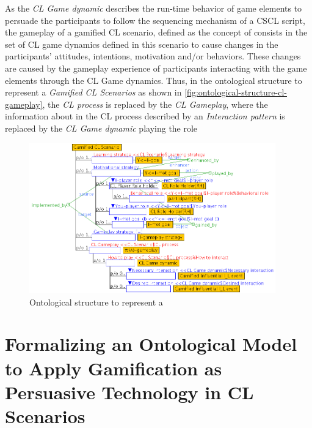As the \emph{CL Game dynamic} describes the run-time behavior of game elements to persuade the participants to follow the sequencing mechanism of a CSCL script, the gameplay of a gamified CL scenario, defined as the concept of  consists in the set of CL game dynamics defined in this scenario to cause changes in the participants' attitudes, intentions, motivation and/or behaviors. These changes are caused by the gameplay experience of participants interacting with the game elements through the CL Game dynamics. Thus, in the ontological structure to represent a \emph{Gamified CL Scenarios} as shown in \autoref{fig:ontological-structure-cl-gameplay}, the \emph{CL process} is replaced by the \emph{CL Gameplay}, where the information about  in the CL process described by an \emph{Interaction pattern} is replaced by the \emph{CL Game dynamic} playing the role  

\begin{figure}[!htbp]
 \caption[Ontological structure to represent a \emph{Gamified CL Scenario}]{Ontological structure to represent a }
 \label{fig:ontological-structure-cl-gameplay}
 \centering
 \includegraphics[width=0.95\textwidth]{images/chap-ontogacles2/ontological-structure-gamified-cl-scenario.png}
 \fautor
\end{figure}

\section[Formalizing an Ontological Model to Apply Gamification as Persuasive Technology]{Formalizing an Ontological Model to Apply Gamification as Persuasive Technology in CL Scenarios}
\label{sec:formalizing-ontological-model-apply-gamification-persuasive-technology}

